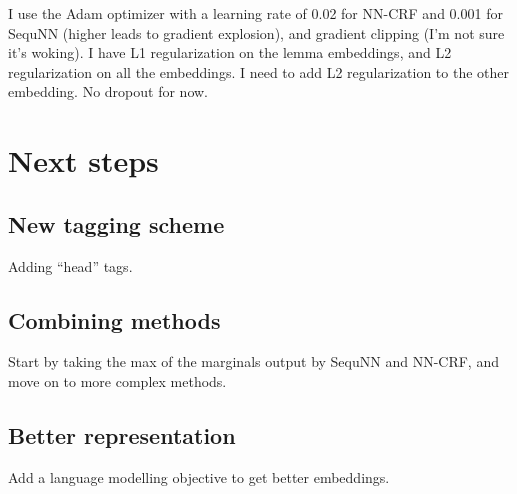\documentclass[10pt,a4paper]{article}
\begin{document}
I use the Adam optimizer with a learning rate of 0.02 for NN-CRF and 0.001 for SequNN (higher leads to gradient explosion), and gradient clipping (I'm not sure it's woking). I have L1 regularization on the lemma embeddings, and L2 regularization on all the embeddings. I need to add L2 regularization to the other embedding. No dropout for now.

\section{Next steps}

\subsection{New tagging scheme}

Adding ``head'' tags.

\subsection{Combining methods}

Start by taking the max of the marginals output by SequNN and NN-CRF, and move on to more complex methods.

\subsection{Better representation}

Add a language modelling objective to get better embeddings.
\end{document}
